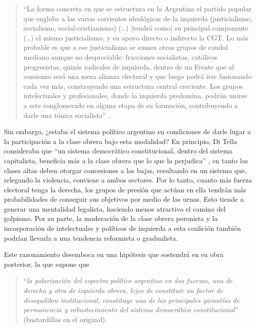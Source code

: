 \begin{quote}
\enquote{La forma concreta en que se estructura en la Argentina el partido popular que englobe a las varias corrientes ideológicas de la izquierda (justicialismo, socialismo, social-cristianismo) (\dots) [tendrá como] su principal componente (\dots) el mismo justicialismo, y su apoyo directo o indirecto la CGT. Lo más probable es que a ese justicialismo se sumen otros grupos de caudal mediano aunque no despreciable: fracciones socialistas, católicos progresistas, quizás radicales de izquierda, dentro de un Frente que al comienzo será una mera alianza electoral y que luego podrá irse fusionando cada vez más, construyendo una estructura central creciente. Los grupos intelectuales y profesionales, donde la izquierda predomina, podrán unirse a este conglomerado en alguna etapa de su formación, contribuyendo a darle una tónica socialista} \parencite[74-75]{1657-DITELLA1965}.
\end{quote}

Sin embargo, ¿estaba el sistema político argentino en condiciones de darle lugar a la participación a la clase obrera bajo esta modalidad? En principio, Di Tella consideraba que \enquote{un sistema democrático constitucional, dentro del sistema capitalista, beneficia más a la clase obrera que lo que la perjudica} \parencite[108]{1649-DITELLA1964}, en tanto las clases altas deben otorgar concesiones a las bajas, resultando en un sistema que, relegando la violencia, conviene a ambos sectores. Por lo tanto, cuanto más fuerza electoral tenga la derecha, los grupos de presión que actúan en ella tendrán más probabilidades de conseguir sus objetivos por medio de las urnas. Esto tiende a generar una mentalidad legalista, haciendo menos atractivo el camino del golpismo. Por su parte, la moderación de la clase obrera peronista y la incorporación de intelectuales y políticos de izquierda a esta coalición también podrían llevarla a una tendencia reformista o gradualista.

Este razonamiento desemboca en una hipótesis que \textcite[111]{1649-DITELLA1964} sostendrá en su obra posterior, la que supone que

\begin{quote}
\enquote{\emph{la polarización del espectro político argentino en dos fuerzas, una de derecha y otra de izquierda obrera, lejos de constituir un factor de desequilibro institucional, constituye una de las principales garantías de permanencia y robustecimiento del sistema democrático constitucional}} (bastardillas en el original).
\end{quote}

